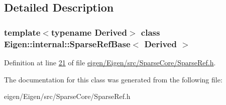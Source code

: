 \subsection{Detailed Description}
\subsubsection*{template$<$typename Derived$>$\newline
class Eigen\+::internal\+::\+Sparse\+Ref\+Base$<$ Derived $>$}



Definition at line \hyperlink{eigen_2_eigen_2src_2_sparse_core_2_sparse_ref_8h_source_l00021}{21} of file \hyperlink{eigen_2_eigen_2src_2_sparse_core_2_sparse_ref_8h_source}{eigen/\+Eigen/src/\+Sparse\+Core/\+Sparse\+Ref.\+h}.



The documentation for this class was generated from the following file\+:\begin{DoxyCompactItemize}
\item 
eigen/\+Eigen/src/\+Sparse\+Core/\+Sparse\+Ref.\+h\end{DoxyCompactItemize}

